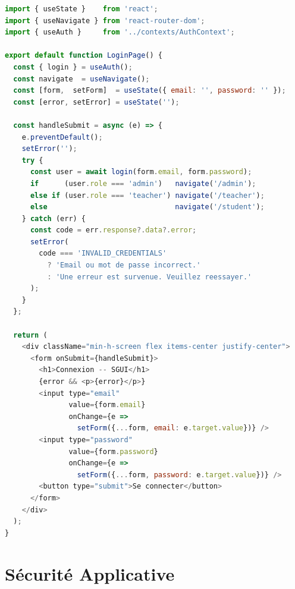 \documentclass[12pt,a4paper,oneside]{report}
\begin{document}
\begin{lstlisting}[language=JavaScript,
  caption=pages/LoginPage.jsx --- Formulaire de connexion]
import { useState }    from 'react';
import { useNavigate } from 'react-router-dom';
import { useAuth }     from '../contexts/AuthContext';

export default function LoginPage() {
  const { login } = useAuth();
  const navigate  = useNavigate();
  const [form,  setForm]  = useState({ email: '', password: '' });
  const [error, setError] = useState('');

  const handleSubmit = async (e) => {
    e.preventDefault();
    setError('');
    try {
      const user = await login(form.email, form.password);
      if      (user.role === 'admin')   navigate('/admin');
      else if (user.role === 'teacher') navigate('/teacher');
      else                              navigate('/student');
    } catch (err) {
      const code = err.response?.data?.error;
      setError(
        code === 'INVALID_CREDENTIALS'
          ? 'Email ou mot de passe incorrect.'
          : 'Une erreur est survenue. Veuillez reessayer.'
      );
    }
  };

  return (
    <div className="min-h-screen flex items-center justify-center">
      <form onSubmit={handleSubmit}>
        <h1>Connexion -- SGUI</h1>
        {error && <p>{error}</p>}
        <input type="email"
               value={form.email}
               onChange={e =>
                 setForm({...form, email: e.target.value})} />
        <input type="password"
               value={form.password}
               onChange={e =>
                 setForm({...form, password: e.target.value})} />
        <button type="submit">Se connecter</button>
      </form>
    </div>
  );
}
\end{lstlisting}

\section{Sécurité Applicative}
\end{document}
